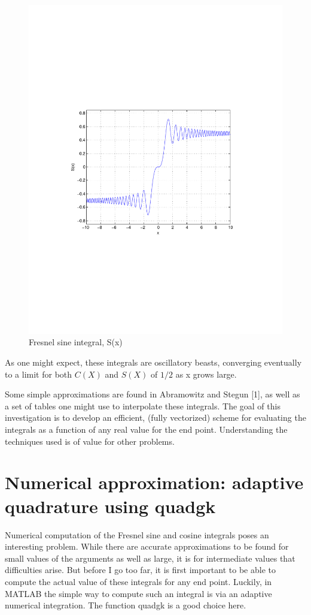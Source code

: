 \documentclass[a4paper,11pt]{article}
\begin{document}
\begin{figure}
\centering
    \includegraphics[width=5in]{S.pdf}
        \caption{Fresnel sine integral, S(x)}
\end{figure}

As one might expect, these integrals are oscillatory beasts, converging eventually to a limit for both $C(X)$ and $S(X)$ of $1/2$ as x grows large.

Some simple approximations are found in Abramowitz and Stegun [1], as well as a set of tables one might use to interpolate these integrals. The goal of this investigation is to develop an efficient, (fully vectorized) scheme for evaluating the integrals as a function of any real value for the end point. Understanding the techniques used is of value for other problems.


\section{Numerical approximation: adaptive quadrature using quadgk}

Numerical computation of the Fresnel sine and cosine integrals poses an interesting problem. While there are accurate approximations to be found for small values of the arguments as well as large, it is for intermediate values that difficulties arise. But before I go too far, it is first important to be able to compute the actual value of these integrals for any end point. Luckily, in MATLAB the simple way to compute such an integral is via an adaptive numerical integration. The function quadgk is a good choice here.
\end{document}
